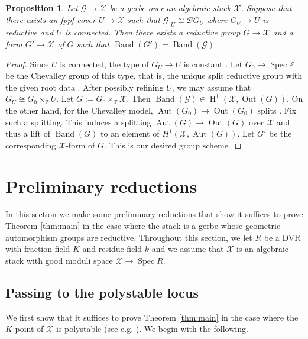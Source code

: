 \documentclass{amsart}
\newtheorem{proposition}[proposition]{Proposition}
\theoremstyle{definition}
\newcommand{\Z}{\mathbb{Z}}
\newcommand{\cG}{\mathcal{G}}
\newcommand{\cX}{\mathcal{X}}
\newcommand{\cB}{\mathcal{B}}
\newcommand{\oH}{\operatorname{H}}
\DeclareMathOperator{\Out}{Out}
\DeclareMathOperator{\Aut}{Aut}
\DeclareMathOperator{\Spec}{Spec}
\DeclareMathOperator{\Band}{Band}
\newcommand{\spec}{\operatorname{Spec}}
\begin{document}
\begin{proposition}\label{prop_every_gerbe_is_banded} Let $\cG \to \cX$ be a gerbe over an algebraic stack $\cX$. Suppose that there exists an fppf cover $U \to \cX$ such that $\cG|_U \cong \cB G_U$ where $G_U \to U$ is reductive and $U$ is connected. Then there exists a reductive group $G \to \cX$ and a form $G' \to \cX$ of $G$ such that $\Band(G') = \Band(\cG)$.     
\end{proposition}

\begin{proof} Since $U$ is connected, the type of $G_U \to U$ is constant \cite[XXII Section 2]{SGA3III}. Let $G_0 \to \Spec \Z$ be the Chevalley group of this type, that is, the unique split reductive group with the given root data \cite[Theorem 6.1.17]{ConradReductive}. After possibly refining $U$, we may assume that $G_U \cong G_0 \times_\Z U$. Let $G := G_0 \times_{\Z} \cX$. Then $\Band(\cG) \in \oH^1(\cX, \Out(G))$. On the other hand, for the Chevalley model, $\Aut(G_0) \to \Out(G_0)$ splits \cite[Theorem 7.1.9 (3)]{ConradReductive}. Fix such a splitting. This induces a splitting $\Aut(G) \to \Out(G)$ over $\cX$ and thus a lift of $\Band(G)$ to an element of $H^1(\cX, \Aut(G))$. Let $G'$ be the corresponding $\cX$-form of $G$. This is our desired group scheme. 
\end{proof} 


\section{Preliminary reductions}

In this section we make some preliminary reductions that show it suffices to prove Theorem \ref{thm:main} in the case where the stack is a gerbe whose geometric automorphism groups are reductive. Throughout this section, we let $R$ be a DVR with fraction field $K$ and residue field $k$ and we assume that $\cX$ is an algebraic stack with good moduli space $\cX \to \spec R$. 

\subsection{Passing to the polystable locus} We first show that it suffices to prove Theorem \ref{thm:main} in the case where the $K$-point of $\cX$ is polystable (see e.g. \cite[Definition 3.2 and Lemma 3.3]{bejleri2024proper}).  We begin with the following.
\end{document}
